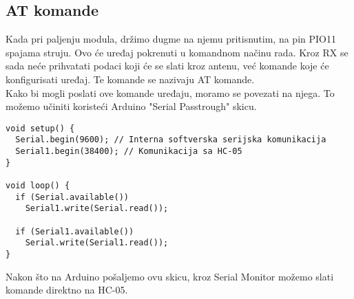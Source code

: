 \documentclass[../Document.tex]{subfiles}
\begin{document}
\subsection{AT komande}
Kada pri paljenju modula, držimo dugme na njemu pritisnutim, na pin PIO11 spajama struju. Ovo će uređaj pokrenuti u komandnom načinu rada. Kroz RX se sada neće prihvatati podaci koji će se slati kroz antenu, već komande koje će konfigurisati uređaj. Te komande se nazivaju AT komande.\\

Kako bi mogli poslati ove komande uređaju, moramo se povezati na njega. To možemo učiniti koristeći Arduino "Serial Passtrough" skicu.\\

\begin{verbatim}
void setup() {
  Serial.begin(9600); // Interna softverska serijska komunikacija
  Serial1.begin(38400); // Komunikacija sa HC-05
}

void loop() {
  if (Serial.available())
    Serial1.write(Serial.read());

  if (Serial1.available())
    Serial.write(Serial1.read());
}
\end{verbatim}

Nakon što na Arduino pošaljemo ovu skicu, kroz Serial Monitor možemo slati komande direktno na HC-05.
\end{document}
